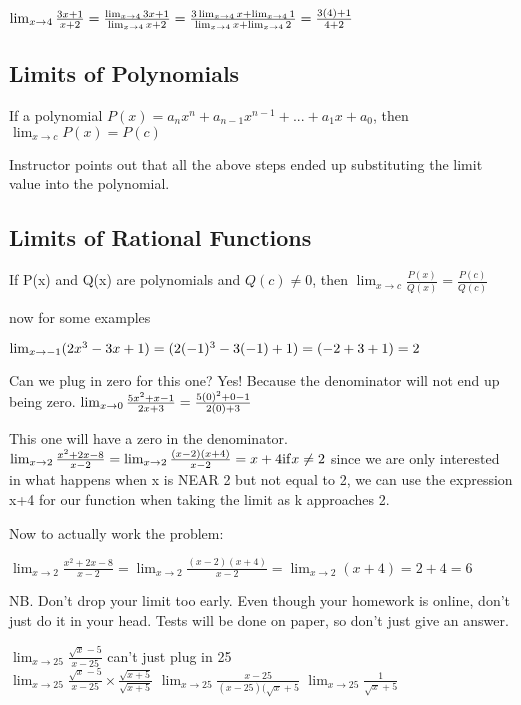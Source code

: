 \documentclass[12pt]{article}
\begin{document}
$\lim_{x \to 4}\frac{3x+1}{x+2}\\
=\frac{\lim_{x \to 4}3x+1}{\lim_{x \to 4}x+2}\\
=\frac{3\lim_{x \to 4}x+\lim_{x \to 4}1}{\lim_{x \to 4}x+\lim_{x \to 4}2}\\
=\frac{3(4)+1}{4+2}
$

\subsection{Limits of Polynomials}
If a polynomial $P(x) = a_n x^n + a_{n-1}x^{n-1}+ ... + a_1x + a_0$, then $\lim_{x \to c} P(x)= P(c)$

Instructor points out that all the above steps ended up substituting the limit value into the polynomial.

\subsection{Limits of Rational Functions}
If P(x) and Q(x) are polynomials and $Q(c) \neq 0$, then $\lim_{x \to c}\frac{P(x)}{Q(x)} = \frac{P(c)}{Q(c)}$

now for some examples

$\lim_{x \to -1}(2x^3 - 3x + 1)\\
= (2(-1)^3 - 3(-1) + 1)\\
= (-2 + 3 + 1)\\
= 2$

Can we plug in zero for this one? Yes! Because the denominator will not end up being zero.
$\lim_{x \to 0}\frac{5x^2 + x - 1}{2x + 3}\\
=\frac{5(0)^2 + 0 - 1}{2(0) + 3}
$

This one will have a zero in the denominator.
$\lim_{x \to 2}\frac{x^2 +2x-8}{x-2}\\
=\lim_{x \to 2}\frac{(x-2)(x+4)}{x-2} = x+4 \mathrm{if}  x \neq 2$
since we are only interested in what happens when x is NEAR 2 but not equal to 2, we can use the expression
x+4 for our function when taking the limit as k approaches 2.

Now to actually work the problem:

$
\lim_{x \to 2}\frac{x^2 +2x-8}{x-2} = \lim_{x \to 2}\frac{(x-2)(x+4)}{x-2} = \lim_{x \to 2}(x+4) = 2+4 = 6
$

NB. Don't drop your limit too early. Even though your homework is online, don't just do it in your head. Tests
will be done on paper, so don't just give an answer.


$\lim_{x \to 25}\frac{\sqrt{x}-5}{x - 25}$ can't just plug in 25\\
$\lim_{x \to 25}\frac{\sqrt{x}-5}{x - 25} \times \frac{\sqrt{x + 5}}{\sqrt{x + 5}}$
$\lim_{x \to 25}\frac{x-25}{(x - 25)(\sqrt{x}+5}$
$\lim_{x \to 25}\frac{1}{\sqrt{x}+5}$
\end{document}

